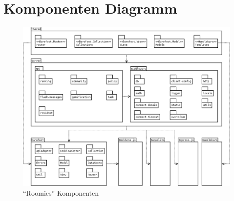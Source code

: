 \section{Komponenten Diagramm}

\begin{figure}[ht]
	\includegraphics[width=\textwidth]{content/sad/diagrams/component-diagram.png}
	\caption{``Roomies'' Komponenten}
\end{figure}